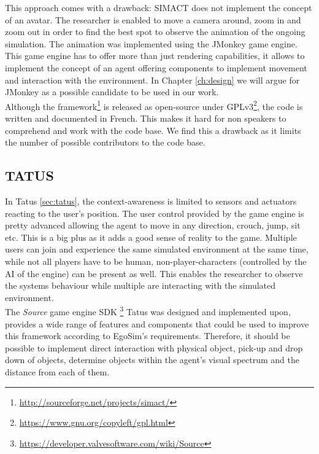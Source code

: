 This approach comes with a drawback: SIMACT does not implement the concept of an avatar. The researcher is enabled to move a camera around, zoom in and zoom out in order to find the best spot to observe the animation of the ongoing simulation. The animation was implemented using the JMonkey game engine. This game engine has to offer more than just rendering capabilities, it allows to implement the concept of an agent offering components to implement movement and interaction with the environment. In Chapter \ref{ch:design} we will argue for JMonkey as a possible candidate to be used in our work.\\

Although the framework\footnote{\url{http://sourceforge.net/projects/simact/}} is released as open-source under GPLv3\footnote{\url{https://www.gnu.org/copyleft/gpl.html}}, the code is written and documented in French. This makes it hard for non speakers to comprehend and work with the code base. We find this a drawback as it limits the number of possible contributors to the code base.\\

\subsection{TATUS}\label{subsec:discussion_tatus}
In Tatus \ref{sec:tatus}, the context-awareness is limited to sensors and actuators reacting to the user's position. The user control provided by the game engine is pretty advanced allowing the agent to move in any direction, crouch, jump, sit etc. This is a big plus as it adds a good sense of reality to the game. Multiple users can join and experience the same simulated environment at the same time, while not all players have to be human, non-player-characters (controlled by the AI of the engine) can be present as well. This enables the researcher to observe the systems behaviour while multiple are interacting with the simulated environment.\\

The \emph{Source} game engine SDK \footnote{\url{https://developer.valvesoftware.com/wiki/Source}} Tatus was designed and implemented upon, provides a wide range of features and components that could be used to improve this framework according to EgoSim's requirements. Therefore, it should be possible to implement direct interaction with physical object, pick-up and drop down of objects, determine objects within the agent's visual spectrum and the distance from each of them.\\

